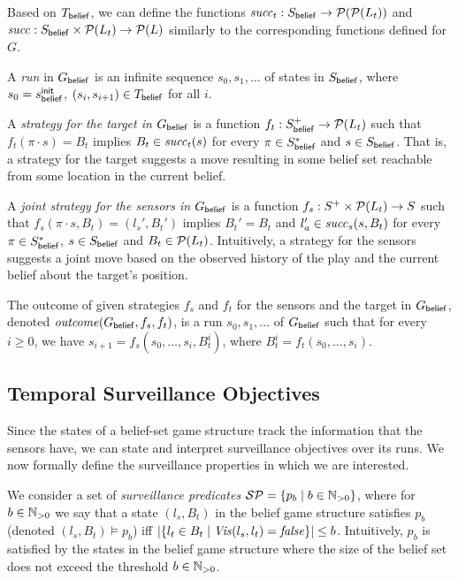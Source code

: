 Based on  $T_{\mathsf{belief}}$, we can define the functions $\mathit{succ}_t : S_{\mathsf{belief}} \to \mathcal{P}(\mathcal{P}(L_t))$ and  $\mathit{succ} : S_{\mathsf{belief}} \times \mathcal{P}(L_t) \to \mathcal{P}(L)$ similarly to the corresponding functions defined for $G$. 

A \emph{run} in $G_{\mathsf{belief}}$ is an infinite sequence $s_0,s_1,\ldots$ of states in $S_{\mathsf{belief}}$, where $s_0 = s_{\mathsf{belief}}^{\mathsf{init}}$,  $(s_i,s_{i+1}) \in T_{\mathsf{belief}}$ for all $i$. 

A \emph{strategy for the target in $G_{\mathsf{belief}}$} is a function $f_t: S_{\mathsf{belief}}^+ \to \mathcal{P}(L_t)$ such that $f_t(\pi\cdot s) = B_t$ implies $B_t \in \mathit{succ}_t(s)$ for every $\pi \in S_{\mathsf{belief}}^*$ and $s \in S_{\mathsf{belief}}$. That is, a strategy for the target suggests a move resulting in some belief set reachable from some location in the current belief.

A \emph{joint strategy for the sensors in $G_{\mathsf{belief}}$} is a function $f_s : S^+ \times \mathcal{P}(L_t) \to S$ such that $f_s(\pi\cdot s,B_t) = (l_s',B_t')$ implies $B_t' = B_t$ and $l_a' \in \mathit{succ}_s(s,B_t)$ for every $\pi \in S_{\mathsf{belief}}^*$, $s \in S_{\mathsf{belief}}$ and $B_t \in \mathcal{P}(L_t)$. Intuitively, a strategy for the sensors suggests a joint move based on the observed history of the play and the current belief about the target's position.

The outcome of given strategies $f_s$ and $f_t$ for the sensors and the target in $G_{\mathsf{belief}}$, denoted $\mathit{outcome}(G_{\mathsf{belief}},f_s,f_t)$, is a run $s_0,s_1,\ldots$ of $G_{\mathsf{belief}}$ such that for every $i \geq 0$, we have $s_{i+1} = f_s(s_0,\ldots,s_i,B_t^i)$, where $B_t^i = f_t(s_0,\ldots,s_i)$.

\subsection{Temporal Surveillance Objectives}
Since the states of a belief-set game structure track the information that the sensors have, we can state and interpret surveillance objectives over its runs. We now formally define the surveillance properties in which we are interested. 

We consider a set of \emph{surveillance predicates} $\mathcal{SP} = \{p_b \mid b \in \mathbb{N}_{>0}\}$, where for $b \in \mathbb{N}_{>0}$ we say that a state $(l_s,B_t)$ in the belief game structure satisfies $p_b$ (denoted $(l_s,B_t) \models p_b$) iff 
$|\{l_t \in B_t \mid \mathit{Vis}(l_s,l_t)  = \mathit{false} \}| \leq b$. Intuitively, $p_b$ is satisfied by the states in the belief game structure where the size of the belief set does not exceed the threshold $b \in \mathbb{N}_{>0}$.

